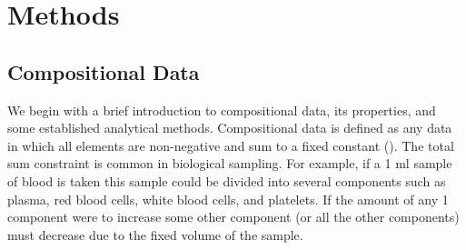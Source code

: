 \documentclass{article}\usepackage[]{graphicx}\usepackage[]{color}
\begin{document}



%




\section{Methods}
\subsection{Compositional Data}
We begin with a brief introduction to compositional data, its properties, and some established analytical methods.  Compositional data is defined as any data in which all elements are non-negative and sum to a fixed constant (\cite{Aitchison1986}). The total sum constraint is common in biological sampling.  For example, if a 1 ml sample of blood is taken this sample could be divided into several components such as plasma, red blood cells, white blood cells, and platelets.  If the amount of any 1 component were to increase some other component (or all the other components) must decrease due to the fixed volume of the sample.  \\

\end{document}
